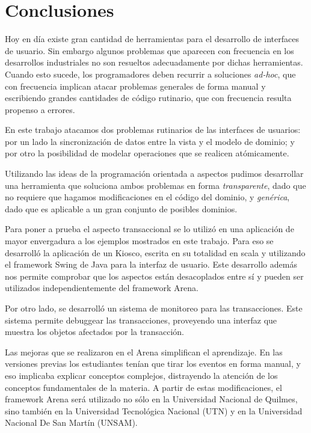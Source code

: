 \section{Conclusiones}
\label{conclusions}
Hoy en día existe gran cantidad de herramientas para el
desarrollo de interfaces de usuario. Sin embargo algunos problemas que
aparecen con frecuencia en los desarrollos industriales no son resueltos
adecuadamente por dichas herramientas.
 Cuando esto sucede, los programadores deben recurrir a soluciones
\emph{ad-hoc},  que con frecuencia implican atacar problemas generales de forma
manual y escribiendo grandes cantidades de código rutinario, que con
frecuencia resulta propenso a errores.

En este trabajo atacamos dos problemas rutinarios de las interfaces de usuarios:
por un lado la sincronización de datos entre la vista y el modelo de dominio; y
por otro la posibilidad de modelar operaciones que se realicen atómicamente.

Utilizando las ideas de la programación orientada a aspectos pudimos desarrollar
una herramienta que soluciona ambos problemas en forma \emph{transparente}, dado
que no requiere que hagamos modificaciones en el código del dominio, y \emph{genérica},
dado que es aplicable a un gran conjunto de posibles dominios.

\medskip

Para poner a prueba el aspecto transaccional se lo utilizó en una aplicación de
mayor envergadura a los ejemplos mostrados en este trabajo.
Para eso se desarrolló la aplicación de un Kiosco, escrita en su totalidad en
scala y utilizando el framework Swing de Java para la interfaz de usuario.
Este desarrollo además nos permite comprobar que los aspectos están desacoplados
entre sí y pueden ser utilizados independientemente del framework Arena.


Por otro lado, se desarrolló un sistema de monitoreo para las transacciones.
Este sistema permite debuggear las transacciones, proveyendo una interfaz que muestra los
objetos afectados por la transacción.


Las mejoras que se realizaron en el Arena simplifican el aprendizaje.
En las versiones previas los estudiantes tenían que tirar los eventos en forma
manual, y eso implicaba explicar conceptos complejos, distrayendo la atención de
los conceptos fundamentales de la materia.
A partir de estas modificaciones, el framework Arena será utilizado no
sólo en la Universidad Nacional de Quilmes, sino también en la Universidad
Tecnológica Nacional (UTN) y en la Universidad Nacional De San Martín (UNSAM).
